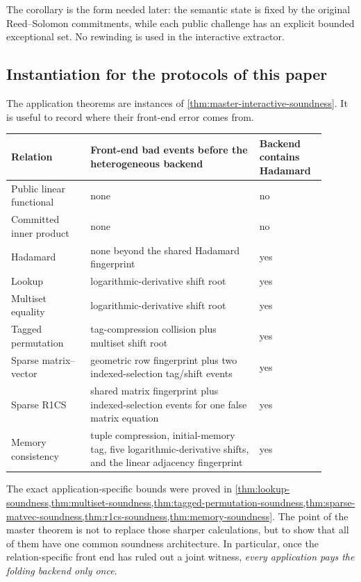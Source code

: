 The corollary is the form needed later: the semantic state is fixed by the original Reed--Solomon commitments, while each public challenge has an explicit bounded exceptional set.  No rewinding is used in the interactive extractor.

\subsection{Instantiation for the protocols of this paper}
\label{sec:global-instantiations}

The application theorems are instances of \cref{thm:master-interactive-soundness}.  It is useful to record where their front-end error comes from.

\begin{center}
\begin{tabular}{>{\raggedright\arraybackslash}p{0.23\linewidth} >{\raggedright\arraybackslash}p{0.49\linewidth} >{\raggedright\arraybackslash}p{0.18\linewidth}}
\toprule
Relation & Front-end bad events before the heterogeneous backend & Backend contains Hadamard \\
\midrule
Public linear functional & none & no \\
Committed inner product & none & no \\
Hadamard & none beyond the shared Hadamard fingerprint & yes \\
Lookup & logarithmic-derivative shift root & yes \\
Multiset equality & logarithmic-derivative shift root & yes \\
Tagged permutation & tag-compression collision plus multiset shift root & yes \\
Sparse matrix--vector & geometric row fingerprint plus two indexed-selection tag/shift events & yes \\
Sparse R1CS & shared matrix fingerprint plus indexed-selection events for one false matrix equation & yes \\
Memory consistency & tuple compression, initial-memory tag, five logarithmic-derivative shifts, and the linear adjacency fingerprint & yes \\
\bottomrule
\end{tabular}
\end{center}

The exact application-specific bounds were proved in \cref{thm:lookup-soundness,thm:multiset-soundness,thm:tagged-permutation-soundness,thm:sparse-matvec-soundness,thm:r1cs-soundness,thm:memory-soundness}.  The point of the master theorem is not to replace those sharper calculations, but to show that all of them have one common soundness architecture.  In particular, once the relation-specific front end has ruled out a joint witness, \emph{every application pays the folding backend only once}.


